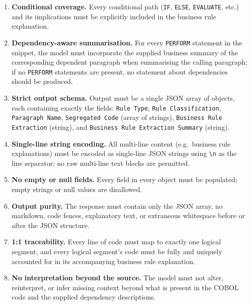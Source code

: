\begin{enumerate}[label=$L_{\arabic*}$:, leftmargin=2.2em]
\item \textbf{Conditional coverage.} Every conditional path (\texttt{IF},
\texttt{ELSE}, \texttt{EVALUATE}, etc.) and its implications must be
explicitly included in the business rule explanation.

\item \textbf{Dependency-aware summarisation.} For every \texttt{PERFORM}
statement in the snippet, the model must incorporate the supplied business
summary of the corresponding dependent paragraph when summarising the
calling paragraph; if no \texttt{PERFORM} statements are present, no
statement about dependencies should be produced.

\item \textbf{Strict output schema.} Output must be a single JSON array of
objects, each containing exactly the fields: \texttt{Rule Type},
\texttt{Rule Classification}, \texttt{Paragraph Name}, \texttt{Segregated
Code} (array of strings), \texttt{Business Rule Extraction} (string), and
\texttt{Business Rule Extraction Summary} (string).

\item \textbf{Single-line string encoding.} All multi-line content
(e.g.\ business rule explanations) must be encoded as single-line JSON
strings using \texttt{\textbackslash n} as the line separator; no raw
multi-line text blocks are permitted.

\item \textbf{No empty or null fields.} Every field in every object must
be populated; empty strings or null values are disallowed.

\item \textbf{Output purity.} The response must contain only the JSON
array, no markdown, code fences, explanatory text, or extraneous
whitespace before or after the JSON structure.

\item \textbf{1:1 traceability.} Every line of code must map to exactly
one logical segment, and every logical segment's code must be fully and
uniquely accounted for in its accompanying business rule explanation.

\item \textbf{No interpretation beyond the source.} The model must not
alter, reinterpret, or infer missing context beyond what is present in
the COBOL code and the supplied dependency descriptions.

\end{enumerate}

